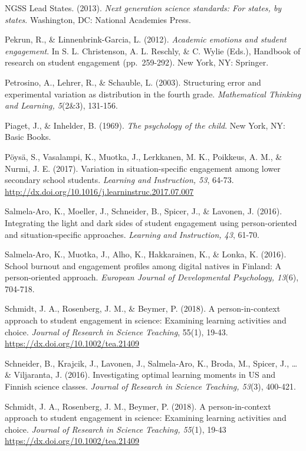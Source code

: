 \documentclass[]{msu-thesis}
\theoremstyle{definition}
\theoremstyle{definition}
\theoremstyle{definition}
\theoremstyle{remark}
\begin{document}
NGSS Lead States. (2013). \emph{Next generation science standards: For
states, by states}. Washington, DC: National Academies Press.

Pekrun, R., \& Linnenbrink-Garcia, L. (2012). \emph{Academic emotions
and student engagement}. In S. L. Christenson, A. L. Reschly, \& C.
Wylie (Eds.), Handbook of research on student engagement (pp.~259-292).
New York, NY: Springer.

Petrosino, A., Lehrer, R., \& Schauble, L. (2003). Structuring error and
experimental variation as distribution in the fourth grade.
\emph{Mathematical Thinking and Learning, 5}(2\&3), 131-156.

Piaget, J., \& Inhelder, B. (1969). \emph{The psychology of the child}.
New York, NY: Basic Books.

Pöysä, S., Vasalampi, K., Muotka, J., Lerkkanen, M. K., Poikkeus, A. M.,
\& Nurmi, J. E. (2017). Variation in situation-specific engagement among
lower secondary school students. \emph{Learning and Instruction, 53},
64-73. \url{http://dx.doi.org/10.1016/j.learninstruc.2017.07.007}

Salmela-Aro, K., Moeller, J., Schneider, B., Spicer, J., \& Lavonen, J.
(2016). Integrating the light and dark sides of student engagement using
person-oriented and situation-specific approaches. \emph{Learning and
Instruction, 43}, 61-70.

Salmela-Aro, K., Muotka, J., Alho, K., Hakkarainen, K., \& Lonka, K.
(2016). School burnout and engagement profiles among digital natives in
Finland: A person-oriented approach. \emph{European Journal of
Developmental Psychology, 13}(6), 704-718.

Schmidt, J. A., Rosenberg, J. M., \& Beymer, P. (2018). A
person-in-context approach to student engagement in science: Examining
learning activities and choice. \emph{Journal of Research in Science
Teaching}, 55(1), 19-43. \url{https://dx.doi.org/10.1002/tea.21409}

Schneider, B., Krajcik, J., Lavonen, J., Salmela‐Aro, K., Broda, M.,
Spicer, J., \ldots{} \& Viljaranta, J. (2016). Investigating optimal
learning moments in US and Finnish science classes. \emph{Journal of
Research in Science Teaching, 53}(3), 400-421.

Schmidt, J. A., Rosenberg, J. M., Beymer, P. (2018). A person-in-context
approach to student engagement in science: Examining learning activities
and choice. \emph{Journal of Research in Science Teaching, 55}(1), 19-43
\url{https://dx.doi.org/10.1002/tea.21409}
\end{document}

